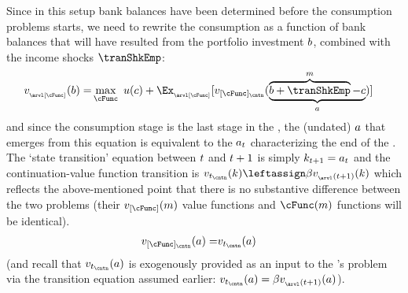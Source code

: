 \documentclass[SolvingMicroDSOPs]{subfiles}
\begin{document}
Since in this setup bank balances have been determined before the consumption problems starts, we need to rewrite the consumption {\stg}  as a function of bank balances that will have resulted from the portfolio investment $b$, combined with the income shocks $\tranShkEmp$:
\begin{equation}\begin{gathered}\begin{aligned}
      \vFunc_{_\arvl[\cFunc]}(\bNrm) = & \max_{\cFunc}~ \uFunc(\cNrm) + \Ex_{_\arvl[\cFunc]}[\vFunc_{[\cFunc]_\cntn}(\underbrace{\overbrace{\bNrm+\tranShkEmp}^{\mNrm}-\cNrm}_{\aNrm})]
    \end{aligned}\end{gathered}\end{equation}
and since the consumption stage is the last stage in the {\interval}, the (undated) $a$ that emerges from this equation is equivalent to the $a_{t}$ characterizing the end of the {\interval}.  The `state transition' equation between $t$ and $t+1$ is simply $k_{t+1} = a_{t}$ and the continuation-value function transition is $\vFunc_{\prd_\cntn}(\kNrm) \leftassign \DiscFac \vFunc_{_\arvl(\prd+1)}(\kNrm)$ which reflects the above-mentioned point that there is no substantive difference between the two problems (their $\vFunc_{[\cFunc]}(\mNrm)$ value functions and $\cFunc(\mNrm)$ functions will be identical).
\begin{equation}\begin{gathered}\begin{aligned}
      \vFunc_{[\cFunc]_\cntn}(\aNrm) = & \vFunc_{\prd_\cntn}(\aNrm)
    \end{aligned}\end{gathered}\end{equation}
(and recall that $\vFunc_{\prd_\cntn}(\aNrm)$ is exogenously provided as an input to the {\interval}'s problem via the transition equation assumed earlier: $\vFunc_{\prd_\cntn}(\aNrm)=\DiscFac \vFunc_{_\arvl(\prd+1)}(a)$).
\end{document}
